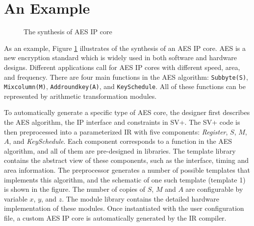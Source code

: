 \section{An Example} 

\begin{figure}[t]
\begin{center}
\caption{The synthesis of AES IP core}\label{fig-example}
\end{center}
\end{figure}

As an example, Figure \ref{fig-example} illustrates of the synthesis of an AES IP core. 
AES \cite{AES} is a new encryption standard which is widely used in 
both software and hardware designs. 
Different applications call for AES IP cores with different speed, area, and frequency. 
There are four main functions in the AES algorithm: {\tt Subbyte(S)}, 
{\tt Mixcolumn(M)}, {\tt Addroundkey(A)}, and {\tt KeySchedule}. 
All of these functions can be represented by arithmetic transformation modules.   

To automatically generate a specific type of AES core, 
the designer first describes the AES algorithm, the IP interface and constraints in SV+. 
The SV+ code is then preprocessed into a parameterized IR with
five components: {\em Register}, $S$, $M$, $A$, and {\em KeySchedule}. 
Each component corresponds to a function in the AES algorithm, and all of them 
are pre-designed in libraries. 
The template library contains the abstract view of these components, 
such as the interface, timing and area information. 
The preprocessor generates a number of possible templates that implements this algorithm,
and the schematic of one such template (template 1) is shown in the figure.
The number of copies of $S$, $M$ and $A$ are configurable by variable $x$, $y$, and $z$.
The module library contains the detailed hardware implementation of these modules. 
Once instantiated with the user configuration file, a custom AES IP core is automatically generated
by the IR compiler.  

